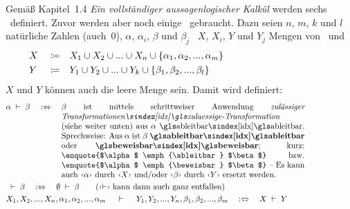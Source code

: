 Gemäß \cite{bib:Rautenberg} Kapitel~1.4 \emph{Ein vollständiger aussagenlogischer Kalkül} werden sechs \Basisregeln\ definiert. Zuvor werden aber noch einige \Definitionen\ gebraucht. Dazu seien $n$, $m$, $k$ und $l$ natürliche Zahlen (auch~0), $\alpha$, $\alpha_i$, $\beta$ und $\beta_j$ \Formeln\, $X$, $X_i$, $Y$ und $Y_j$ Mengen von \Formeln\ und
\begin{align}
	&X&&\coloneqq&&X_1\cup X_2\cup...\cup X_n\cup\{\alpha_1,\alpha_2,...,\alpha_m\}
	\\
	&Y&&\coloneqq&&Y_1\cup Y_2\cup...\cup Y_k\cup\{\beta_1, \beta_2, ...,\beta_l \}
	&&&&&&&&&&&&&&&&&&&&
\end{align}
%
$X$ und $Y$ können auch die leere Menge sein. Damit wird definiert:
\begin{align}
	& \alpha \derive \beta \quad \metadefeq \quad
	\parbox[t]{10.5cm}{%
	$\beta$ ist mittels schrittweiser Anwendung \emph{\zulaessigerTransformationen} (siehe weiter unten) aus $\alpha$ \ableitbar.
	Sprechweise: Aus $\alpha$ ist $\beta$ \defn{\ableitbar} oder \defn{\beweisbar};
	kurz: \enquote{$\alpha$ \emph{\ableitbar} $\beta$} \textbzw\ \enquote{$\alpha$ \emph{\beweisbar} $\beta$}
	-- Es kann auch \chrqt{$\alpha$} durch \chrqt{$X$} und/oder \chrqt{$\beta$} durch \chrqt{$Y$} ersetzt werden.
	}
	\label{def:ableitbar}
	\\
	& \derive \beta \quad \metadefeq \quad \emptyset \derive \beta \qquad \text{(\chrqt{$\derivesym$} kann dann auch ganz entfallen)}
	\\
	&             X_1, X_2, ...,X_n, \alpha_1, \alpha_2, ..., \alpha_m \quad
	\derive \quad Y_1, Y_2, ...,Y_n,  \beta_1,  \beta_2,  ..., \beta_m \quad
	\metadefeq \quad X \derive Y
	\label{def:ableitbarKurz}
	\formulatoleft
\end{align}
%
